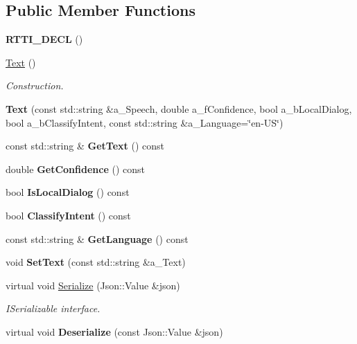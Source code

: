 \subsection*{Public Member Functions}
\begin{DoxyCompactItemize}
\item 
\mbox{\label{class_text_aed53805928ff9f9cac7cf1d61754fe9a}} 
{\bfseries R\+T\+T\+I\+\_\+\+D\+E\+CL} ()
\item 
\mbox{\label{class_text_ab3e26143fccc52699bcc5149cae852bc}} 
\hyperlink{class_text_ab3e26143fccc52699bcc5149cae852bc}{Text} ()
\begin{DoxyCompactList}\small\item\em Construction. \end{DoxyCompactList}\item 
\mbox{\label{class_text_aeb42acf8fae51a9ceccda347bc74926f}} 
{\bfseries Text} (const std\+::string \&a\+\_\+\+Speech, double a\+\_\+f\+Confidence, bool a\+\_\+b\+Local\+Dialog, bool a\+\_\+b\+Classify\+Intent, const std\+::string \&a\+\_\+\+Language=\char`\"{}en-\/US\char`\"{})
\item 
\mbox{\label{class_text_a7f92fab25827ccb68728f642fa47d2cb}} 
const std\+::string \& {\bfseries Get\+Text} () const
\item 
\mbox{\label{class_text_a9a4da2a691c7ec5d75cfeeb3c0ba2820}} 
double {\bfseries Get\+Confidence} () const
\item 
\mbox{\label{class_text_a8e9303d0d0a504ef1ffe33cf54ee1aef}} 
bool {\bfseries Is\+Local\+Dialog} () const
\item 
\mbox{\label{class_text_a8e67d2096c74cea6c16646c318c261a3}} 
bool {\bfseries Classify\+Intent} () const
\item 
\mbox{\label{class_text_a5806db0a5fe1d6108f5963d5bd5ba2c0}} 
const std\+::string \& {\bfseries Get\+Language} () const
\item 
\mbox{\label{class_text_a7866cb666ef13a6e9324c4230dee6aa7}} 
void {\bfseries Set\+Text} (const std\+::string \&a\+\_\+\+Text)
\item 
\mbox{\label{class_text_a17ba419891b5a48c0ab824d7074de6bd}} 
virtual void \hyperlink{class_text_a17ba419891b5a48c0ab824d7074de6bd}{Serialize} (Json\+::\+Value \&json)
\begin{DoxyCompactList}\small\item\em I\+Serializable interface. \end{DoxyCompactList}\item 
\mbox{\label{class_text_a6ad75ef21419f1c2c1621e1f85f0c031}} 
virtual void {\bfseries Deserialize} (const Json\+::\+Value \&json)
\end{DoxyCompactItemize}
